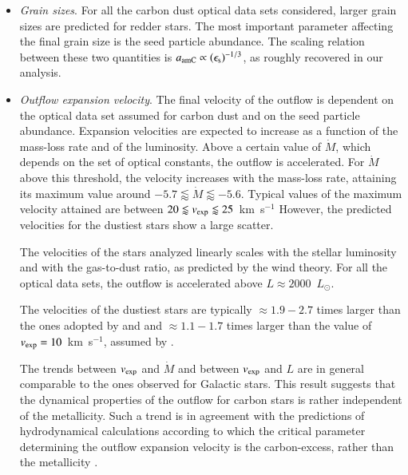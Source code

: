 \documentclass[useAMS,usenatbib]{mn2e/mn2e}
\begin{document}
{\begin{itemize}
The gas-to-dust ratio anti-correlates with the mass-loss rates. Such a trend suggest that the dust condensation efficiency increases with the density in the CSEs.
The relation between $\Psi_{\rm dust}$ and $\dot{M}$ is very steep for $\log\dot{M}\lessapprox-6$ and it tends to saturate for $\log\dot{M}\gtrapprox-6$. Indeed, for mass-loss rates larger than this threshold value, the dependence between $\Psi_{\rm dust}$ and $\dot{M}$ is milder.

\item \textit{Grain sizes}. For all the carbon dust optical data sets considered, larger grain sizes are predicted for redder stars. The most important parameter affecting the final grain size is the seed particle abundance.
The scaling relation between these two quantities is $a_{\rm amC}\propto(\epsilon_{\rm s})^{-1/3}$, as roughly recovered in our analysis.

\item \textit{Outflow expansion velocity}. The final velocity of the outflow is dependent on the optical data set assumed for carbon dust and on the seed particle abundance. Expansion velocities are expected to increase as a function of the mass-loss rate and of the luminosity. 
Above a certain value of $\dot{M}$, which depends on the set of optical constants, the outflow is accelerated. For $\dot{M}$ above this threshold, the velocity increases with the mass-loss rate, attaining its maximum value around $-5.7\lessapprox\dot{M}\lessapprox-5.6$. Typical values of the maximum velocity attained are between $20\lessapprox v_{\rm exp}\lessapprox25$~km~s$^{-1}$
However, the predicted velocities for the dustiest stars show a large scatter.

The velocities of the stars analyzed linearly scales with the stellar luminosity and with the gas-to-dust ratio, as predicted by the wind theory. For all the optical data sets, the outflow is accelerated above $L\approx2000$~$L_{\odot}$.

The velocities of the dustiest stars are typically $\approx1.9-2.7$ times larger than the ones adopted by \citet{Boyer12} and \citet{Srinivasan16} and $\approx1.1-1.7$ times larger than the value of $v_{\rm exp}=10$~km~s$^{-1}$, assumed by \citet{Groenewegen07}.

The trends between $v_{\rm exp}$ and $\dot{M}$ and between $v_{\rm exp}$ and $L$ are in general comparable to the ones observed for Galactic stars.
This result suggests that the dynamical properties of the outflow for carbon stars is rather independent of the metallicity. 
Such a trend is in agreement with the predictions of hydrodynamical calculations according to which the critical parameter determining the outflow expansion velocity is the carbon-excess, rather than the metallicity \citep{Mattsson10,Eriksson14}.


\end{itemize}}
\end{document}
